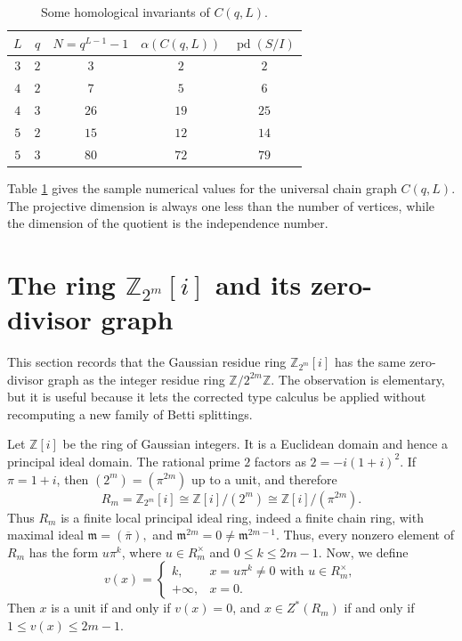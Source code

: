 \documentclass[12pt]{article}
\theoremstyle{definition}
\begin{document}
\medskip

\begin{table}[H]
	\centering
	\begin{tabular}{c c c c c}
		\toprule
		$L$ & $q$ & $N=q^{L-1}-1$ & $\alpha(C(q,L))$ & $\operatorname{pd}(S/I)$ \\
		\midrule
		$3$ & $2$ & $3$ & $2$ & $2$ \\
		$4$ & $2$ & $7$ & $5$ & $6$ \\
		$4$ & $3$ & $26$ & $19$ & $25$ \\
		$5$ & $2$ & $15$ & $12$ & $14$ \\
		$5$ & $3$ & $80$ & $72$ & $79$ \\
		\bottomrule
	\end{tabular}
	\caption{Some homological invariants of $C(q,L)$.}
	\label{tab:chain-samples}
\end{table}
Table \ref{tab:chain-samples} gives the sample numerical values for the universal chain graph $C(q,L)$.  The projective dimension is always one less than the number of vertices, while the dimension of the quotient is the independence number.

\section{The ring \texorpdfstring{$\mathbb{Z}_{2^m}[i]$}{Z_2^m[i]} and its zero-divisor graph}\label{sec:gaussian}
 This section records that the Gaussian residue ring $\mathbb{Z}_{2^m}[i]$ has the same zero-divisor graph as the integer residue ring $\mathbb{Z}/2^{2m}\mathbb{Z}$.  The observation is elementary, but it is useful because it lets the corrected type calculus be applied without recomputing a new family of Betti splittings.

\medskip

Let \(\mathbb{Z}[i]\) be the ring of Gaussian integers.  It is a Euclidean domain and hence a principal ideal domain.  The rational prime \(2\) factors as $2=-i(1+i)^2.$ 
If \(\pi=1+i\), then $(2^m)=(\pi^{2m})$ up to a unit, and therefore
\[
R_m=\mathbb{Z}_{2^m}[i]\cong \mathbb{Z}[i]/(2^m)\cong \mathbb{Z}[i]/(\pi^{2m}).
\]
Thus \(R_m\) is a finite local principal ideal ring, indeed a finite chain ring, with maximal ideal
$\mathfrak{m}=(\overline\pi),$ and $\mathfrak{m}^{2m}=0\ne \mathfrak{m}^{2m-1}.$ Thus, every nonzero element of \(R_m\) has the form \(u\pi^k\), where \(u\in R_m^\times\) and \(0\le k\le 2m-1\).  Now, we define
\[
v(x)=
\begin{cases}
	k, & x=u\pi^k\ne0\text{ with }u\in R_m^\times,\\[2pt]
	+\infty, & x=0.
\end{cases}
\]
Then \(x\) is a unit if and only if \(v(x)=0\), and \(x\in Z^*(R_m)\) if and only if \(1\le v(x)\le 2m-1\).
\end{document}
